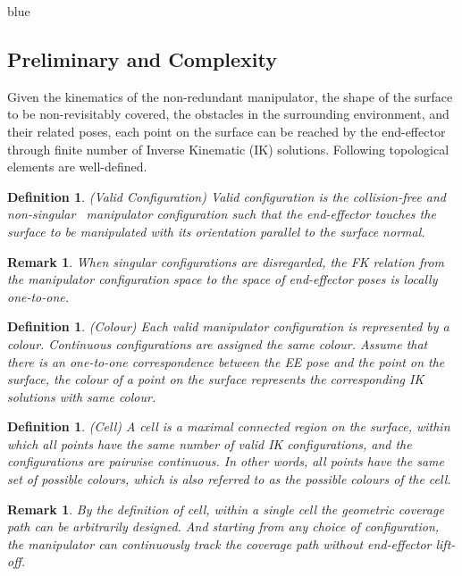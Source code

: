 \documentclass[journal]{IEEEtran}
\newtheorem{definition}[theorem]{Definition}
\newtheorem{remark}[theorem]{Remark}
\begin{document}
\begin{color}{blue}
\subsection{Preliminary and Complexity}
Given the kinematics of the non-redundant manipulator, the shape of the surface to be non-revisitably covered, the obstacles in the surrounding environment, and their related poses, each point on the surface can be reached by the end-effector through finite number of Inverse Kinematic (IK) solutions. Following topological elements are well-defined. 
\begin{definition}
(Valid Configuration) Valid configuration is the collision-free and non-singular~\cite{Yoshikawa1990Translational} manipulator configuration such that the end-effector touches the surface to be manipulated with its orientation parallel to the surface normal.  
\end{definition}
\begin{remark}
When singular configurations are disregarded, the FK relation from the manipulator configuration space to the space of end-effector poses is locally one-to-one.  
\end{remark}
\begin{definition}
(Colour) Each valid manipulator configuration is represented by a colour. Continuous configurations are assigned the same colour. Assume that there is an one-to-one correspondence between the EE pose and the point on the surface, the colour of a point on the surface represents the corresponding IK solutions with same colour. 
\end{definition}
\begin{definition}
(Cell) A cell is a maximal connected region on the surface, within which all points have the same number of valid IK configurations, and the configurations are pairwise continuous. 
In other words, all points have the same set of possible colours, which is also referred to as the possible colours of the cell. 
\end{definition}
\begin{remark}
By the definition of cell, within a single cell the geometric coverage path can be arbitrarily designed. 
And starting from any choice of configuration, the manipulator can continuously track the coverage path without end-effector lift-off. 
\end{remark}


\end{color}
\end{document}
